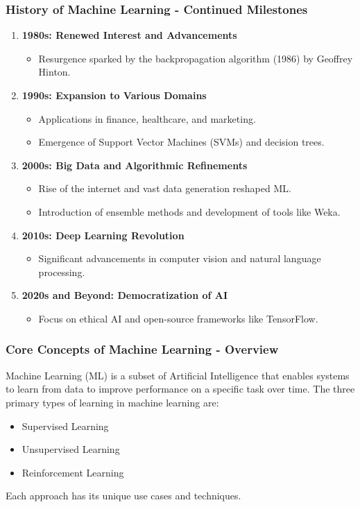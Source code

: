 \documentclass{beamer}
\begin{document}
\begin{frame}[fragile]
    \frametitle{History of Machine Learning - Continued Milestones}
    \begin{enumerate}[resume]
        \item \textbf{1980s: Renewed Interest and Advancements}
            \begin{itemize}
                \item Resurgence sparked by the backpropagation algorithm (1986) by Geoffrey Hinton.
            \end{itemize}
        \item \textbf{1990s: Expansion to Various Domains}
            \begin{itemize}
                \item Applications in finance, healthcare, and marketing.
                \item Emergence of Support Vector Machines (SVMs) and decision trees.
            \end{itemize}
        \item \textbf{2000s: Big Data and Algorithmic Refinements}
            \begin{itemize}
                \item Rise of the internet and vast data generation reshaped ML.
                \item Introduction of ensemble methods and development of tools like Weka.
            \end{itemize}
        \item \textbf{2010s: Deep Learning Revolution}
            \begin{itemize}
                \item Significant advancements in computer vision and natural language processing.
            \end{itemize}
        \item \textbf{2020s and Beyond: Democratization of AI}
            \begin{itemize}
                \item Focus on ethical AI and open-source frameworks like TensorFlow.
            \end{itemize}
    \end{enumerate}
\end{frame}

\begin{frame}[fragile]
    \frametitle{Core Concepts of Machine Learning - Overview}
    Machine Learning (ML) is a subset of Artificial Intelligence that enables systems to learn from data to improve performance on a specific task over time. 
    The three primary types of learning in machine learning are:
    \begin{itemize}
        \item Supervised Learning
        \item Unsupervised Learning
        \item Reinforcement Learning
    \end{itemize}
    Each approach has its unique use cases and techniques.
\end{frame}
\end{document}
